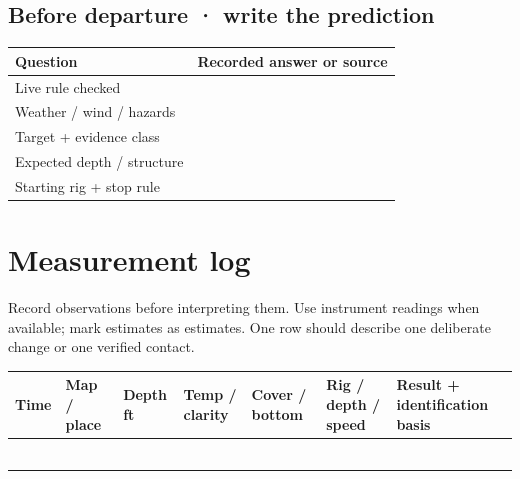 \subsection*{Before departure · write the prediction}
\begin{tabularx}{\linewidth}{@{}p{.27\linewidth}L@{}}
\toprule
Question & Recorded answer or source\\
\midrule
Live rule checked & \rule{0pt}{2.1em}\dotfill\\
Weather / wind / hazards & \rule{0pt}{2.1em}\dotfill\\
Target + evidence class & \rule{0pt}{2.1em}\dotfill\\
Expected depth / structure & \rule{0pt}{2.1em}\dotfill\\
Starting rig + stop rule & \rule{0pt}{2.1em}\dotfill\\
\bottomrule
\end{tabularx}

\clearpage
\section*{Measurement log}
Record observations before interpreting them. Use instrument readings when
available; mark estimates as estimates. One row should describe one deliberate
change or one verified contact.

\scriptsize
\begin{tabularx}{\linewidth}{@{}p{.08\linewidth}p{.09\linewidth}p{.10\linewidth}
p{.11\linewidth}p{.12\linewidth}p{.13\linewidth}L@{}}
\toprule
Time & Map / place & Depth ft & Temp / clarity & Cover / bottom &
Rig / depth / speed & Result + identification basis\\
\midrule
\rule{0pt}{3.3em}&&&&&&\\ \midrule
\rule{0pt}{3.3em}&&&&&&\\ \midrule
\rule{0pt}{3.3em}&&&&&&\\ \midrule
\rule{0pt}{3.3em}&&&&&&\\ \midrule
\rule{0pt}{3.3em}&&&&&&\\ \midrule
\rule{0pt}{3.3em}&&&&&&\\
\bottomrule
\end{tabularx}
\normalsize

